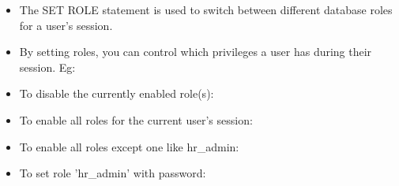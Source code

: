 
\begin{flushleft}
	
	\begin{itemize}
		\item The SET ROLE statement is used to switch between different database roles for a user's session. 
		\item By setting roles, you can control which privileges a user has during their session.
		\bigskip
		Eg:
		\item To disable the currently enabled role(s):
		\item To enable all roles for the current user's session:
		\item To enable all roles except one like hr\_admin:
		\item To set role 'hr\_admin' with password:
		
	\end{itemize}
	
\end{flushleft}
